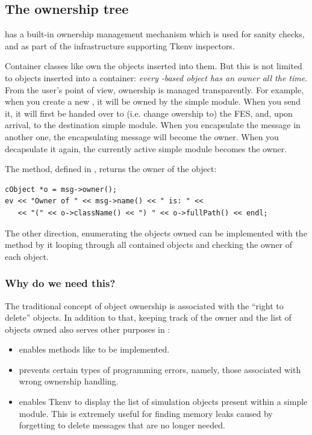 \subsection{The ownership tree}

{\opp} has a built-in ownership management mechanism which
is used for sanity checks, and as part of the infrastructure
supporting Tkenv inspectors.

Container classes like  own the objects inserted
into them. But this is not limited to objects inserted into a container:
\textit{every -based object has an owner all the time}.
From the user's point of view, ownership is managed transparently.
For example, when you create a new ,
it will be owned by the simple module. When you send it, it will
first be handed over to (i.e. change owership to) the FES, and,
upon arrival, to the destination simple module. When you encapsulate
the message in another one, the encapsulating message will become
the owner. When you decapsulate it again, the currently active
simple module becomes the owner.

The  method, defined in , returns the
owner of the object:

\begin{verbatim}
cObject *o = msg->owner();
ev << "Owner of " << msg->name() << " is: " <<
   << "(" << o->className() << ") " << o->fullPath() << endl;
\end{verbatim}

The other direction, enumerating the objects owned can be implemented with
the  method by it looping through all
contained objects and checking the owner of each object.

\subsubsection{Why do we need this?}

The traditional concept of object ownership is associated with
the ``right to delete'' objects. In addition to that,
keeping track of the owner and the list of objects owned also
serves other purposes in {\opp}:

\begin{itemize}
    \item{enables methods like  to be implemented.}

    \item{prevents certain types of programming errors, namely,
    those associated with wrong ownership handling.}

    \item{enables Tkenv to display the list of simulation objects
    present within a simple module. This is extremely useful for finding
    memory leaks caused by forgetting to delete messages that are
    no longer needed.}
\end{itemize}

